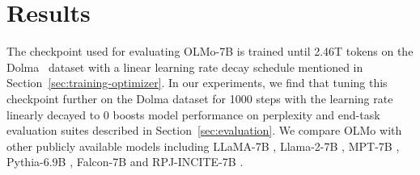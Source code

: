 \documentclass[11pt]{article}
\newcommand{\olmo}{OLMo\xspace}
\newcommand{\model}{OLMo-7B\xspace}
\begin{document}
\section{Results}
\label{sec:results}
The checkpoint used for evaluating \model is trained until 2.46T
tokens on the Dolma~\citep{dolma} dataset with a linear learning rate decay schedule mentioned in Section~\ref{sec:training-optimizer}. In our experiments, we find that tuning this checkpoint further on the Dolma dataset for 1000 steps with the learning rate linearly decayed to 0 boosts model performance on perplexity and end-task evaluation suites described in Section~\ref{sec:evaluation}.  We compare \olmo with other publicly available models including LLaMA-7B \citep{touvron2023llama1}, Llama-2-7B \citep{touvron2023llama2}, MPT-7B \citep{MosaicML2023Introducing}, Pythia-6.9B \citep{pmlr-v202-biderman23a}, Falcon-7B \citep{Falcon} and RPJ-INCITE-7B \citep{together2023redpajama}.
\end{document}

